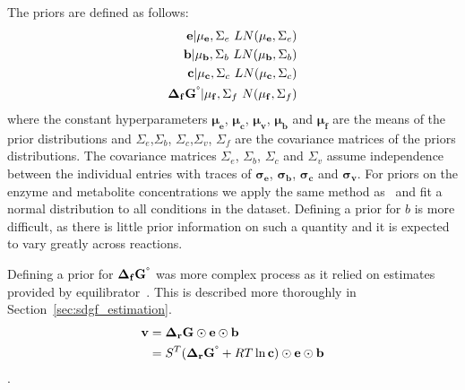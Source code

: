 \documentclass[10pt,letterpaper]{article}
\newcommand{\sdgf}{\Delta_fG^{\degree}}
\newcommand{\dgr}{\Delta_rG}
\newcommand{\sdgr}{\Delta_rG^{\degree}}
\newcommand{\bsdgf}{\mathbf{\sdgf}}
\newcommand{\bdgr}{\mathbf{\dgr}}
\newcommand{\bsdgr}{\mathbf{\sdgr}}
\newcommand{\be}{\mathbf{e}}
\newcommand{\bc}{\mathbf{c}}
\newcommand{\bb}{\mathbf{b}}
\newcommand{\bv}{\mathbf{v}}
\begin{document}
The priors are defined as follows:
\begin{align*}
    \be|\mathbf{\mu_e}, \Sigma_e ~ LN(\mathbf{\mu_e}, \Sigma_e) \\
    \bb|\mathbf{\mu_b}, \Sigma_b ~ LN(\mathbf{\mu_b}, \Sigma_b) \\
    \bc|\mathbf{\mu_c}, \Sigma_c ~ LN(\mathbf{\mu_c}, \Sigma_c) \\
    \bsdgf|\mathbf{\mu_{f}}, \Sigma_{f} ~ N(\mathbf{\mu_{f}}, \Sigma_{f}) \\
\end{align*}
where the constant hyperparameters $\mathbf{\mu_e}$, $\mathbf{\mu_c}$, $\mathbf{\mu_v}$, $\mathbf{\mu_b}$ and $\mathbf{\mu_f}$ are the means of the prior distributions and $\Sigma_e$,$\Sigma_b$, $\Sigma_c$,$\Sigma_v$, $\Sigma_f$ are the covariance matrices of the priors distributions.
The covariance matrices $\Sigma_e$, $\Sigma_b$, $\Sigma_c$ and $\Sigma_v$ assume independence between the individual entries with traces of $\mathbf{\sigma_e}$, $\mathbf{\sigma_b}$, $\mathbf{\sigma_c}$ and $\mathbf{\sigma_v}$.
For priors on the enzyme and metabolite concentrations we apply the same method as~\cite{PTA} and fit a normal distribution to all conditions in the dataset. %
Defining a prior for $b$ is more difficult, as there is little prior information on such a quantity and it is expected to vary greatly across reactions.

Defining a prior for $\bsdgf$ was more complex process as it relied on estimates provided by equilibrator~\cite{noor_2013_equilibrator}.
This is described more thoroughly in Section~\ref{sec:sdgf_estimation}.
\begin{align}
    \bv &= \bdgr \odot \be \odot \bb \\
        &= S^T (\bsdgr + RT\ln{\bc}) \odot \be \odot \bb \\
\end{align}
.
\end{document}
